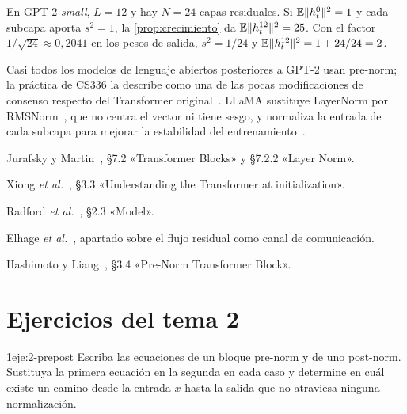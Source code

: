\begin{ejemplo}\label{ej:crecimiento}
En GPT-2 \emph{small}, $L=12$ y hay $N=24$ capas residuales. Si $\mathbb{E}\lVert h^{0}_t\rVert^{2}=1$ y cada subcapa aporta $s^{2}=1$, la \cref{prop:crecimiento} da $\mathbb{E}\lVert h^{12}_t\rVert^{2}=25$. Con el factor $1/\sqrt{24}\approx 0{,}2041$ en los pesos de salida, $s^{2}=1/24$ y $\mathbb{E}\lVert h^{12}_t\rVert^{2}=1+24/24=2$.
\end{ejemplo}

\begin{observacion}
Casi todos los modelos de lenguaje abiertos posteriores a GPT-2 usan pre-norm; la práctica de CS336 la describe como una de las pocas modificaciones de consenso respecto del Transformer original~\cite[§7.3]{cs336}. LLaMA sustituye LayerNorm por RMSNorm~\cite{rmsnorm}, que no centra el vector ni tiene sesgo, y normaliza la entrada de cada subcapa para mejorar la estabilidad del entrenamiento~\cite[§2.2]{llama}.
\end{observacion}

\begin{lecturas}
\item Jurafsky y Martin~\cite{jm3}, §7.2 «Transformer Blocks» y §7.2.2 «Layer Norm».
\item Xiong \emph{et al.}~\cite{xiong}, §3.3 «Understanding the Transformer at initialization».
\item Radford \emph{et al.}~\cite{gpt2}, §2.3 «Model».
\item Elhage \emph{et al.}~\cite{elhage}, apartado sobre el flujo residual como canal de comunicación.
\item Hashimoto y Liang~\cite{cs336}, §3.4 «Pre-Norm Transformer Block».
\end{lecturas}

\section*{Ejercicios del tema 2}

\begin{ejercicio}{1}{eje:2-prepost}
Escriba las ecuaciones de un bloque pre-norm y de uno post-norm. Sustituya la primera ecuación en la segunda en cada caso y determine en cuál existe un camino desde la entrada $x$ hasta la salida que no atraviesa ninguna normalización.
\end{ejercicio}

